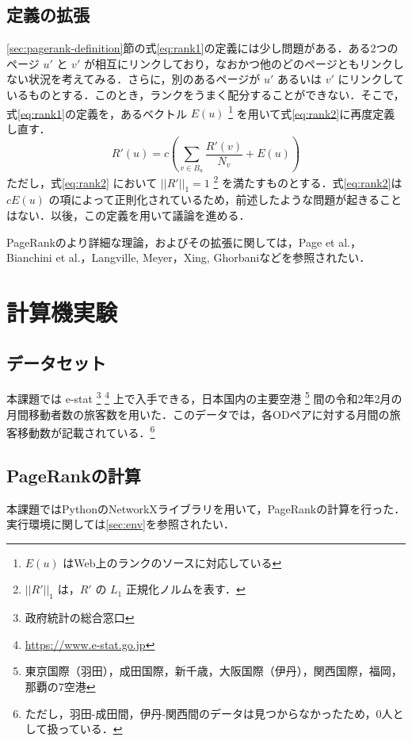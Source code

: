 \documentclass[a4j, dvipdfmx, twocolumn]{jsarticle}
\begin{document}
\subsection{定義の拡張}
\label{sec:pagerank-definition-extension}
\ref{sec:pagerank-definition}節の式\eqref{eq:rank1}の定義には少し問題がある．ある2つのページ $u'$ と $v'$ が相互にリンクしており，なおかつ他のどのページともリンクしない状況を考えてみる．さらに，別のあるページが $u'$ あるいは $v'$ にリンクしているものとする．このとき，ランクをうまく配分することができない．そこで，式\eqref{eq:rank1}の定義を，あるベクトル $E(u)$ \footnote{$E(u)$ はWeb上のランクのソースに対応している} を用いて式\eqref{eq:rank2}に再度定義し直す．
\begin{equation}
  \label{eq:rank2}
  R'(u) = c \left( \sum_{v \in B_u} \frac{R'(v)}{N_v} + E(u)\right)
\end{equation}
ただし，式\eqref{eq:rank2} において $||R'||_1 = 1$ 
\footnote{$||R'||_1$ は，$R'$ の $L_1$ 正規化ノルムを表す．}
を満たすものとする．式\eqref{eq:rank2}は $cE(u)$ の項によって正則化されているため，前述したような問題が起きることはない．以後，この定義を用いて議論を進める．

PageRankのより詳細な理論，およびその拡張に関しては，Page et al.\cite{ilprints422}，Bianchini et al.\cite{bianchini2005inside}，Langville, Meyer\cite{langville2004deeper}，Xing, Ghorbani\cite{xing2004weighted}などを参照されたい．

\section{計算機実験}
\subsection{データセット}
本課題では e-stat
\footnote{政府統計の総合窓口}
\footnote{\url{https://www.e-stat.go.jp}}
上で入手できる，日本国内の主要空港
\footnote{東京国際（羽田），成田国際，新千歳，大阪国際（伊丹），関西国際，福岡，那覇の7空港}
間の令和2年2月の月間移動者数の旅客数を用いた．このデータでは，各ODペアに対する月間の旅客移動数が記載されている．\footnote{ただし，羽田-成田間，伊丹-関西間のデータは見つからなかったため，0人として扱っている．}

\subsection{PageRankの計算}
本課題ではPythonのNetworkXライブラリを用いて，PageRankの計算を行った．実行環境に関しては\ref{sec:env}を参照されたい．
\end{document}
